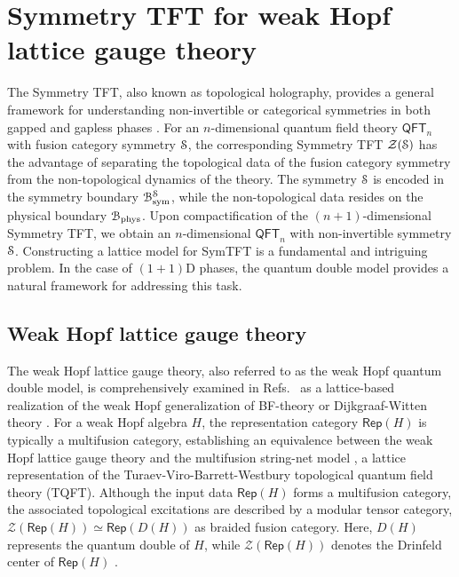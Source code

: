 \documentclass[a4paper,11pt]{article}
\theoremstyle{theorem}
\theoremstyle{remark}
\newcommand{\Rep}{\mathsf{Rep}}
\begin{document}
\section{Symmetry TFT for weak Hopf lattice gauge theory}
\label{sec:WHAsymTFT}

The Symmetry TFT, also known as topological holography, provides a general framework for understanding non-invertible or categorical symmetries in both gapped and gapless phases \cite{Kong2020algebraic, SchaferNameki2024ICTP, huang2023topologicalholo, bhardwaj2024lattice, freed2024topSymTFT, gaiotto2021orbifold, bhardwaj2023generalizedcharge, apruzzi2023symmetry, bhardwaj2024gappedphases, Zhang2024anomaly, Ji2020categoricalsym}. 
For an \( n \)-dimensional quantum field theory \(\mathsf{QFT}_n\) with fusion category symmetry \(\EuScript{S}\), the corresponding Symmetry TFT \(\mathcal{Z}(\EuScript{S})\) has the advantage of separating the topological data of the fusion category symmetry from the non-topological dynamics of the theory.
The symmetry \(\EuScript{S}\) is encoded in the symmetry boundary \(\EuScript{B}_{\text{sym}}^{\EuScript{S}}\), while the non-topological data resides on the physical boundary \(\EuScript{B}_{\text{phys}}\). Upon compactification of the \((n+1)\)-dimensional Symmetry TFT, we obtain an \(n\)-dimensional \(\mathsf{QFT}_n\) with non-invertible symmetry \(\EuScript{S}\).
Constructing a lattice model for SymTFT is a fundamental and intriguing problem. In the case of $(1+1)$D phases, the quantum double model provides a natural framework for addressing this task.


\subsection{Weak Hopf lattice gauge theory}

The weak Hopf lattice gauge theory, also referred to as the weak Hopf quantum double model, is comprehensively examined in Refs.~\cite{chang2014kitaev, Jia2023weak} as a lattice-based realization of the weak Hopf generalization of BF-theory or Dijkgraaf-Witten theory \cite{dijkgraaf1990topological}. For a weak Hopf algebra \( H \), the representation category \( \Rep(H) \) is typically a multifusion category, establishing an equivalence between the weak Hopf lattice gauge theory and the multifusion string-net model \cite{jia2024weakTube}, a lattice representation of the Turaev-Viro-Barrett-Westbury topological quantum field theory (TQFT).
Although the input data \( \Rep(H) \) forms a multifusion category, the associated topological excitations are described by a modular tensor category, \( \mathcal{Z}(\Rep(H)) \simeq \Rep(D(H)) \) as braided fusion category. Here, \( D(H) \) represents the quantum double of \( H \), while \( \mathcal{Z}(\Rep(H)) \) denotes the Drinfeld center of \( \Rep(H) \) \cite{jia2024weakTube}.
\end{document}

